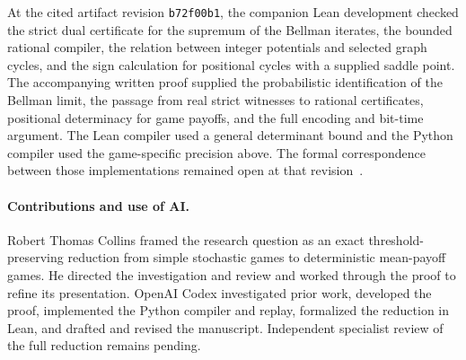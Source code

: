 \documentclass[11pt,letterpaper]{article}
\begin{document}
At the cited artifact revision \texttt{b72f00b1}, the companion Lean development
checked the strict dual certificate for the supremum of the Bellman iterates,
the bounded rational compiler, the relation between integer
potentials and selected graph cycles, and the sign calculation for positional
cycles with a supplied saddle point. The accompanying written proof supplied
the probabilistic identification of the Bellman limit, the passage from real
strict witnesses to rational certificates, positional determinacy for game
payoffs, and the full encoding and bit-time argument. The Lean compiler used a
general determinant bound and the Python compiler used the game-specific
precision above. The formal correspondence between those implementations
remained open at that revision~\cite{artifact}.

\paragraph{Contributions and use of AI.}
Robert Thomas Collins framed the research question as an exact
threshold-preserving reduction from simple stochastic games to deterministic
mean-payoff games. He directed the investigation and review and worked through
the proof to refine its presentation. OpenAI Codex investigated prior work,
developed the proof, implemented the Python compiler and replay, formalized the
reduction in Lean, and drafted and revised the manuscript. Independent specialist review of the full
reduction remains pending.
\end{document}
